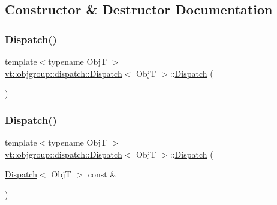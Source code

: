 \subsection{Constructor \& Destructor Documentation}
\mbox{\label{structvt_1_1objgroup_1_1dispatch_1_1_dispatch_ae4fa82d799ff73006340737e2a4f2c13}} 
\subsubsection{\texorpdfstring{Dispatch()}{Dispatch()}\hspace{0.1cm}{\footnotesize\ttfamily [1/4]}}
{\footnotesize\ttfamily template$<$typename ObjT $>$ \\
\hyperlink{structvt_1_1objgroup_1_1dispatch_1_1_dispatch}{vt\+::objgroup\+::dispatch\+::\+Dispatch}$<$ ObjT $>$\+::\hyperlink{structvt_1_1objgroup_1_1dispatch_1_1_dispatch}{Dispatch} (\begin{DoxyParamCaption}{ }\end{DoxyParamCaption})\hspace{0.3cm}{\ttfamily [delete]}}

\mbox{\label{structvt_1_1objgroup_1_1dispatch_1_1_dispatch_aa36763c5e026720041c4a405a593b9f3}} 
\subsubsection{\texorpdfstring{Dispatch()}{Dispatch()}\hspace{0.1cm}{\footnotesize\ttfamily [2/4]}}
{\footnotesize\ttfamily template$<$typename ObjT $>$ \\
\hyperlink{structvt_1_1objgroup_1_1dispatch_1_1_dispatch}{vt\+::objgroup\+::dispatch\+::\+Dispatch}$<$ ObjT $>$\+::\hyperlink{structvt_1_1objgroup_1_1dispatch_1_1_dispatch}{Dispatch} (\begin{DoxyParamCaption}\item[{\hyperlink{structvt_1_1objgroup_1_1dispatch_1_1_dispatch}{Dispatch}$<$ ObjT $>$ const \&}]{ }\end{DoxyParamCaption})\hspace{0.3cm}{\ttfamily [delete]}}

